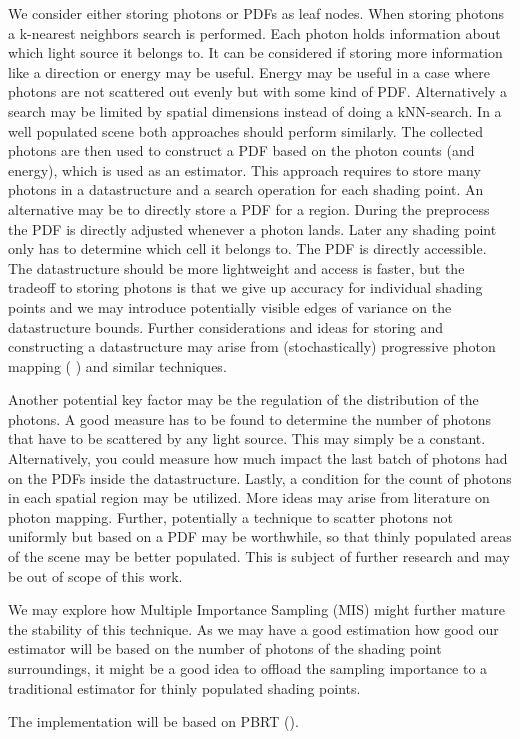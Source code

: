 We consider either storing photons or PDFs as leaf nodes. When storing photons a k-nearest neighbors search is performed. Each photon holds information about which light source it belongs to. It can be considered if storing more information like a direction or energy may be useful. Energy may be useful in a case where photons are not scattered out evenly but with some kind of PDF. Alternatively a search may be limited by spatial dimensions instead of doing a kNN-search. In a well populated scene both approaches should perform similarly. The collected photons are then used to construct a PDF based on the photon counts (and energy), which is used as an estimator. This approach requires to store many photons in a datastructure and a search operation for each shading point. An alternative may be to directly store a PDF for a region. During the preprocess the PDF is directly adjusted whenever a photon lands. Later any shading point only has to determine which cell it belongs to. The PDF is directly accessible. The datastructure should be more lightweight and access is faster, but the tradeoff to storing photons is that we give up accuracy for individual shading points and we may introduce potentially visible edges of variance on the datastructure bounds. Further considerations and ideas for storing and constructing a datastructure may arise from (stochastically) progressive photon mapping (\cite{Hachisuka2008ProgressivePM} \cite{Hachisuka2009StochasticPP}) and similar techniques.

Another potential key factor may be the regulation of the distribution of the photons. A good measure has to be found to determine the number of photons that have to be scattered by any light source. This may simply be a constant. Alternatively, you could measure how much impact the last batch of photons had on the PDFs inside the datastructure. Lastly, a condition for the count of photons in each spatial region may be utilized. More ideas may arise from literature on photon mapping. Further, potentially a technique to scatter photons not uniformly but based on a PDF may be worthwhile, so that thinly populated areas of the scene may be better populated. This is subject of further research and may be out of scope of this work.

We may explore how Multiple Importance Sampling (MIS) might further mature the stability of this technique. As we may have a good estimation how good our estimator will be based on the number of photons of the shading point surroundings, it might be a good idea to offload the sampling importance to a traditional estimator for thinly populated shading points.

The implementation will be based on PBRT (\cite{pbrt}).

